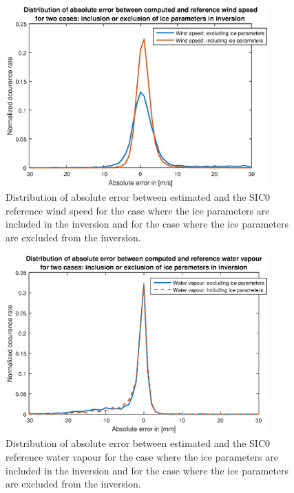 \documentclass[11pt, a4paper]{article}
\begin{document}
\begin{figure}[h]
	\centering
	\includegraphics[width=0.9\textwidth]{task6_fig_1.eps}
	\caption{Distribution of absolute error between estimated and the SIC0 reference wind speed for the case where the ice parameters are included in the inversion and for the case where the ice parameters are excluded from the inversion.}
	\label{fig:task6_fig_1}
\end{figure}
\begin{figure}[h]
	\centering
	\includegraphics[width=0.9\textwidth]{task6_fig_2.eps}
	\caption{Distribution of absolute error between estimated and the SIC0 reference water vapour for the case where the ice parameters are included in the inversion and for the case where the ice parameters are excluded from the inversion.}
	\label{fig:task6_fig_2}
\end{figure}
\end{document}
